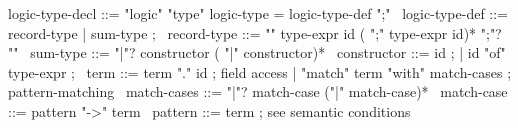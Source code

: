 \begin{syntax}
  logic-type-decl ::= "logic" "type" logic-type = logic-type-def ";"  
  \
  logic-type-def ::= record-type | sum-type ; 
  \
  record-type ::= "{" type-expr id ( ";" type-expr id)* ";"? "}" 
  \
  sum-type ::= "|"? constructor ( "|" constructor)* 
  \
  constructor ::= id ;
  | id "of" type-expr ;
  \
  term ::= term "." id ; field access
  | "match" term "with" match-cases ; pattern-matching
  \
  match-cases ::= "|"? match-case ("|" match-case)* 
  \
  match-case ::= pattern "->" term
  \
  pattern ::= term ; see semantic conditions
\end{syntax}